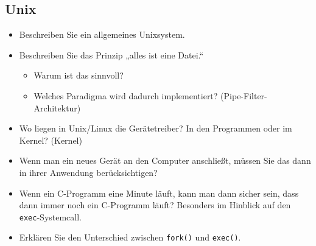 \documentclass[
  a4paper,
  11pt,
]{article}
\title{}
\author{}
\begin{document}
\thispagestyle{fancy}

\subsection*{Unix}
\label{sub:Unix}

\begin{itemize}
  \item Beschreiben Sie ein allgemeines Unixsystem.
  \item Beschreiben Sie das Prinzip „alles ist eine Datei.“
    \begin{itemize}
      \item Warum ist das sinnvoll?
      \item Welches Paradigma wird dadurch implementiert?
        (Pipe-Filter-Architektur)
    \end{itemize}
  \item Wo liegen in Unix/Linux die Gerätetreiber? In den Programmen oder im
    Kernel? (Kernel)
  \item Wenn man ein neues Gerät an den Computer anschließt, müssen Sie das dann
    in ihrer Anwendung berücksichtigen?
  \item Wenn ein C-Programm eine Minute läuft, kann man dann sicher sein, dass
    dann immer noch ein C-Programm läuft? Besonders im Hinblick auf den
    \texttt{exec}-Systemcall.
  \item Erklären Sie den Unterschied zwischen \texttt{fork()} und
    \texttt{exec()}.
\end{itemize}
\end{document}

